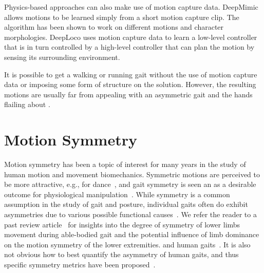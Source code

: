 Physics-based approaches can also make use of motion capture data. DeepMimic \cite{2018-TOG-deepMimic} allows motions to be learned simply from a short motion capture clip. The algorithm has been shown to work on different motions and character morphologies. DeepLoco \cite{2017-TOG-deepLoco} uses motion capture data to learn a low-level controller that is in turn controlled by a high-level controller that can plan the motion by sensing its surrounding environment.

It is possible to get a walking or running gait without the use of motion capture data or imposing some form of structure on the solution. However, the resulting motions are usually far from appealing with an asymmetric gait and the hands flailing about \cite{emergence_locomotion}. 


\section{Motion Symmetry}
Motion symmetry has been a topic of interest for many years in the study of human motion and movement biomechanics. 
Symmetric motions are perceived to be more attractive, e.g., for dance~\cite{danceSymmetry},
and gait symmetry is seen an as a desirable outcome for physiological manipulation~\cite{robinson1987use}.
While symmetry is a common assumption in the study of gait and posture, 
individual gaits often do exhibit asymmetries due to various possible functional causes~\cite{seelet}.
We refer the reader to a past review article~\cite{SADEGHI200034} for insights
into the degree of symmetry of lower limbs movement during able-bodied gait
and the potential influence of limb dominance on the motion symmetry of the lower extremities.
and human gaits~\cite{riskowski}.
It is also not obvious how to best quantify 
the asymmetry of human gaits, and thus specific symmetry metrics have been
proposed~\cite{symmetry_measures,symmetry_phase_portrait}.

% 
% 


